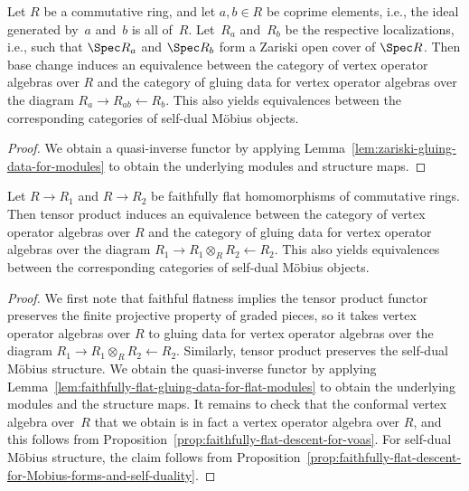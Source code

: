 \begin{lem} \label{lem:zariski-gluing-for-voas}Let $R$ be a commutative ring, and let $a,b \in R$ be coprime elements, i.e., the ideal generated by~$a$ and~$b$ is all of~$R$. Let~$R_a$ and~$R_b$ be the respective localizations, i.e., such that $\Spec R_a$ and $\Spec R_b$ form a Zariski open cover of $\Spec R$. Then base change induces an equivalence between the category of vertex operator algebras over $R$ and the category of gluing data for vertex operator algebras over the diagram $R_a \to R_{ab} \leftarrow R_b$. This also yields equivalences between the corresponding categories of self-dual M\"obius objects.
\end{lem}
\begin{proof}We obtain a quasi-inverse functor by applying Lemma~\ref{lem:zariski-gluing-data-for-modules} to obtain the underlying modules and structure maps.
\end{proof}

\begin{lem} \label{lem:faithfully-flat-gluing-data-for-voas}Let $R \to R_1$ and $R \to R_2$ be faithfully flat homomorphisms of commutative rings. Then tensor product induces an equivalence between the category of vertex operator algebras over $R$ and the category of gluing data for vertex operator algebras over the diagram $R_1 \to R_1 \otimes_{R} R_2 \leftarrow R_2$. This also yields equivalences between the corresponding categories of self-dual M\"obius objects.
\end{lem}
\begin{proof}We first note that faithful flatness implies the tensor product functor preserves the finite projective property of graded pieces, so it takes vertex operator algebras over $R$ to gluing data for vertex operator algebras over the diagram $R_1 \to R_1 \otimes_{R} R_2 \leftarrow R_2$. Similarly, tensor pro\-duct preserves the self-dual M\"obius structure. We obtain the quasi-inverse functor by applying Lemma~\ref{lem:faithfully-flat-gluing-data-for-flat-modules} to obtain the underlying modules and the structure maps. It remains to check that the conformal vertex algebra over~$R$ that we obtain is in fact a vertex operator algebra over $R$, and this follows from Proposition~\ref{prop:faithfully-flat-descent-for-voas}. For self-dual M\"obius structure, the claim follows from Proposition~\ref{prop:faithfully-flat-descent-for-Mobius-forms-and-self-duality}.
\end{proof}

